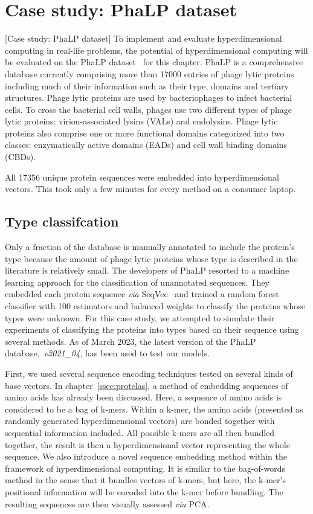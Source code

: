 \chapter{Case study: PhaLP dataset}[Case study: PhaLP dataset]
To implement and evaluate hyperdimensional computing in real-life problems, the potential of hyperdimensional computing will be evaluated on the PhaLP dataset~\cite{phalp} for this chapter. PhaLP is a comprehensive database currently comprising more than 17000 entries of phage lytic proteins including much of their information such as their type, domains and tertiary structures. Phage lytic proteins are used by bacteriophages to infect bacterial cells. To cross the bacterial cell walls, phages use two different types of phage lytic proteins: virion-associated lysins (VALs) and endolysins. Phage lytic proteins also comprise one or more functional domains categorized into two classes: enzymatically active domains (EADs) and cell wall binding domains (CBDs).

All 17356 unique protein sequences were embedded into hyperdimensional vectors. This took only a few minutes for every method on a consumer laptop.

\section{Type classifcation}
Only a fraction of the database is manually annotated to include the protein's type because the amount of phage lytic proteins whose type is described in the literature is relatively small. The developers of PhaLP resorted to a machine learning approach for the classification of unannotated sequences. They embedded each protein sequence \textit{via} SeqVec~\cite{seqvec} and trained a random forest classifier with 100 estimators and balanced weights to classify the proteins whose types were unknown. For this case study, we attempted to simulate their experiments of classifying the proteins into types based on their sequence using several methods. As of March 2023, the latest version of the PhaLP database,~\textit{v2021\_04}, has been used to test our models.

First, we used several sequence encoding techniques tested on several kinds of base vectors. In chapter~\ref{ssec:protclas}, a method of embedding sequences of amino acids has already been discussed. Here, a sequence of amino acids is considered to be a bag of k-mers. Within a k-mer, the amino acids (presented as randomly generated hyperdimensional vectors) are bonded together with sequential information included. All possible k-mers are all then bundled together, the result is then a hyperdimensional vector representing the whole sequence. We also introduce a novel sequence embedding method within the framework of hyperdimensional computing. It is similar to the bag-of-words method in the sense that it bundles vectors of k-mers, but here, the k-mer's positional information will be encoded into the k-mer before bundling. The resulting sequences are then visually assessed \textit{via} PCA. 

